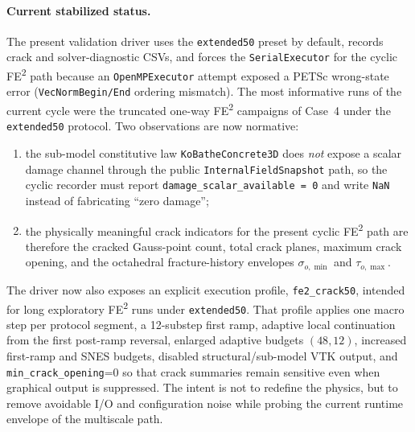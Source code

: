 \paragraph{Current stabilized status.}
The present validation driver uses the \texttt{extended50} preset by default,
records crack and solver-diagnostic CSVs, and forces the
\texttt{SerialExecutor} for the cyclic FE\textsuperscript{2} path because an
\texttt{OpenMPExecutor} attempt exposed a PETSc wrong-state error
(\texttt{VecNormBegin/End} ordering mismatch).  The most informative runs of
the current cycle were the truncated one-way FE\textsuperscript{2} campaigns
of Case~4 under the \texttt{extended50} protocol.  Two observations are now
normative:
\begin{enumerate}
  \item the sub-model constitutive law \texttt{KoBatheConcrete3D} does
    \emph{not} expose a scalar damage channel through the public
    \texttt{InternalFieldSnapshot} path, so the cyclic recorder must report
    \texttt{damage\_scalar\_available = 0} and write \texttt{NaN} instead of
    fabricating ``zero damage'';
  \item the physically meaningful crack indicators for the present cyclic FE\textsuperscript{2}
    path are therefore the cracked Gauss-point count, total crack planes,
    maximum crack opening, and the octahedral fracture-history envelopes
    \(\sigma_{o,\min}\) and \(\tau_{o,\max}\).
\end{enumerate}

The driver now also exposes an explicit execution profile,
\texttt{fe2\_crack50}, intended for long exploratory
FE\textsuperscript{2} runs under \texttt{extended50}.  That profile applies
one macro step per protocol segment, a 12-substep first ramp, adaptive local
continuation from the first post-ramp reversal, enlarged adaptive budgets
\((48,12)\), increased first-ramp and SNES budgets, disabled
structural/sub-model VTK output, and
\texttt{min\_crack\_opening}=0 so that crack summaries remain sensitive even
when graphical output is suppressed.  The intent is not to redefine the
physics, but to remove avoidable I/O and configuration noise while probing the
current runtime envelope of the multiscale path.

